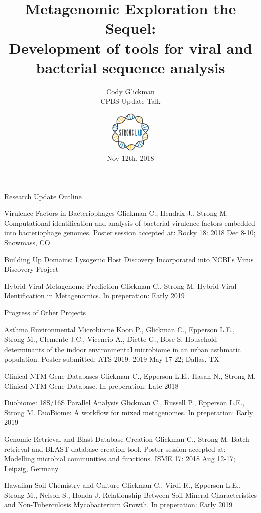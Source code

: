 \documentclass[11pt, xcolor=table]{beamer}
\author{Cody Glickman  \\ CPBS Update Talk}
\title{Metagenomic Exploration the Sequel: \\ Development of tools for viral and bacterial sequence analysis}
\date{ \includegraphics[height=2cm, width=2cm]{lablogo.png} \\ Nov 12th, 2018}
\begin{document}
	\maketitle

	\begin{frame}{Research Update Outline}
	\begin{block}{Virulence Factors in Bacteriophages}
	\tiny{Glickman C., Hendrix J., Strong M. Computational identification and analysis of bacterial virulence factors embedded into bacteriophage genomes. Poster session accepted at: Rocky 18: 2018 Dec 8-10; Snowmass, CO}
	\end{block}
	
	\begin{block}{Building Up Domains: Lysogenic Host Discovery}
  Incorporated into NCBI's Virus Discovery Project
	\end{block}

	\begin{block}{Hybrid Viral Metagenome Prediction}
	\tiny{Glickman C., Strong M. Hybrid Viral Identification in Metagenomics. In preperation: Early 2019}
	\end{block}
	\end{frame}
	\begin{frame}{Progress of Other Projects}
	\begin{block}{Asthma Environmental Microbiome}
	\tiny{Koon P., Glickman C., Epperson L.E., Strong M., Clemente J.C., Vicencio A., Diette G., Bose S. Household determinants of the indoor environmental microbiome in an urban asthmatic population. Poster submitted: ATS 2019: 2019 May 17-22; Dallas, TX}
 
	\end{block}
	
		
	\begin{block}{Clinical NTM Gene Databases}
	\tiny{Glickman C., Epperson L.E., Hasan N., Strong M. Clinical NTM Gene Database. In preperation: Late 2018}
	\end{block}
	
	\begin{block}{Duobiome: 18S/16S Parallel Analysis}
	\tiny{Glickman C., Russell P., Epperson L.E., Strong M. DuoBiome: A workflow for mixed metagenomes. In preperation: Early 2019}
	\end{block}
	
	
	\begin{block}{Genomic Retrieval and Blast Database Creation}
	\tiny{Glickman C., Strong M. Batch retrieval and BLAST database creation tool. Poster session accepted at: Modelling microbial communities and functions. ISME 17: 2018 Aug 12-17; Leipzig, Germany}
	\end{block}
	
	\begin{block}{Hawaiian Soil Chemistry and Culture}
	\tiny{Glickman C., Virdi R., Epperson L.E., Strong M., Nelson S., Honda J. Relationship Between Soil Mineral Characteristics and Non-Tuberculosis Mycobacterium Growth. In preperation: Early 2019}
	\end{block}
	

	\end{frame}
\end{document}
